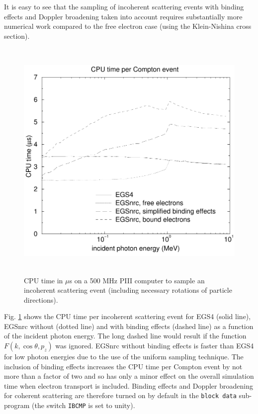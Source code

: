 It is easy to see that the sampling of incoherent scattering events 
with binding effects and Doppler broadening taken into account 
requires substantially more numerical work compared to 
the free electron case (using the Klein-Nishina cross section). 
\begin{figure}[h]
\includegraphics[height=12cm,width=12cm]{figures/comp_times}
\caption[CPU times for Compton sampling]{\label{comp_times}
CPU time in $\mu$s on a 500 MHz PIII computer to sample an incoherent 
scattering event (including necessary rotations of particle directions).}
\end{figure}
Fig. \ref{comp_times} shows the CPU time per incoherent scattering event 
for EGS4 (solid line), EGSnrc without (dotted line) 
and with binding effects (dashed line) as a function of the incident 
photon energy. The long dashed line would result if the function 
$F(k,\cos \theta,p_z)$ was ignored. EGSnrc without binding effects is 
faster than EGS4 for low photon energies due to the use of 
the uniform sampling technique. The inclusion of binding effects 
increases the CPU time per Compton event by not more than a 
factor of two and so has only a minor effect on the overall simulation 
time when electron transport is included. Binding effects and 
Doppler broadening for coherent scattering are therefore turned 
on by default in the {\tt block data} sub-program (the switch 
{\tt IBCMP} is set to unity).

